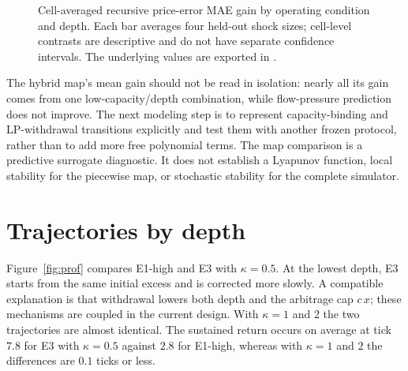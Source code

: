 \begin{figure}[H]
\centering
{}
\caption{Cell-averaged recursive price-error MAE gain by operating condition and depth. Each bar averages four held-out shock sizes; cell-level contrasts are descriptive and do not have separate confidence intervals. The underlying values are exported in .}
\label{fig:hybrid-cell-gains}
\end{figure}

The hybrid map’s mean gain should not be read in isolation: nearly all its gain comes from one low-capacity/depth combination, while flow-pressure prediction does not improve. The next modeling step is to represent capacity-binding and LP-withdrawal transitions explicitly and test them with another frozen protocol, rather than to add more free polynomial terms. The map comparison is a predictive surrogate diagnostic. It does not establish a Lyapunov function, local stability for the piecewise map, or stochastic stability for the complete simulator.

\section{Trajectories by depth}

Figure~\ref{fig:prof} compares E1-high and E3 with $\kappa=0.5$. At the lowest depth, E3 starts from the same initial excess and is corrected more slowly. A compatible explanation is that withdrawal lowers both depth and the arbitrage cap $c\,x$; these mechanisms are coupled in the current design. With $\kappa=1$ and $2$ the two trajectories are almost identical. The sustained return occurs on average at tick $7.8$ for E3 with $\kappa=0.5$ against $2.8$ for E1-high, whereas with $\kappa=1$ and $2$ the differences are $0.1$ ticks or less.

